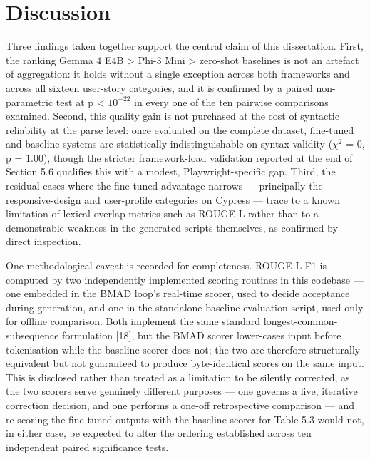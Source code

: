 \section{Discussion}

Three findings taken together support the central claim of this
dissertation. First, the ranking Gemma 4 E4B \textgreater{} Phi-3 Mini
\textgreater{} zero-shot baselines is not an artefact of aggregation: it
holds without a single exception across both frameworks and across all
sixteen user-story categories, and it is confirmed by a paired
non-parametric test at p \textless{} $10^{-22}$ in every one of the ten
pairwise comparisons examined. Second, this quality gain is not
purchased at the cost of syntactic reliability at the parse level: once
evaluated on the complete dataset, fine-tuned and baseline systems are
statistically indistinguishable on syntax validity ($\chi^2$ = 0, p =
1.00), though the stricter framework-load validation reported at the end
of Section 5.6 qualifies this with a modest, Playwright-specific gap.
Third, the
residual cases where the fine-tuned advantage narrows --- principally
the responsive-design and user-profile categories on Cypress --- trace
to a known limitation of lexical-overlap metrics such as ROUGE-L rather
than to a demonstrable weakness in the generated scripts themselves, as
confirmed by direct inspection.

One methodological caveat is recorded for completeness. ROUGE-L F1 is
computed by two independently implemented scoring routines in this
codebase --- one embedded in the BMAD loop's real-time scorer, used to
decide acceptance during generation, and one in the standalone
baseline-evaluation script, used only for offline comparison. Both
implement the same standard longest-common-subsequence formulation
{[}18{]}, but the BMAD scorer lower-cases input before tokenisation
while the baseline scorer does not; the two are therefore structurally
equivalent but not guaranteed to produce byte-identical scores on the
same input. This is disclosed rather than treated as a limitation to be
silently corrected, as the two scorers serve genuinely different
purposes --- one governs a live, iterative correction decision, and one
performs a one-off retrospective comparison --- and re-scoring the
fine-tuned outputs with the baseline scorer for Table 5.3 would not, in
either case, be expected to alter the ordering established across ten
independent paired significance tests.
